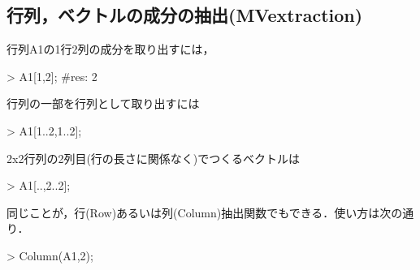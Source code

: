 \subsection{行列，ベクトルの成分の抽出(MVextraction)}
行列A1の1行2列の成分を取り出すには，
\begin{MapleInput}
> A1[1,2]; #res: 2
\end{MapleInput}
行列の一部を行列として取り出すには
\begin{MapleInput}
> A1[1..2,1..2];
\end{MapleInput}
\begin{MapleOutput}
\displaystyle  \left[ \begin {array}{cc} 1&2\\ 3&4\end {array} \right]
\end{MapleOutput}
2x2行列の2列目(行の長さに関係なく)でつくるベクトルは
\begin{MapleInput}
> A1[..,2..2];
\end{MapleInput}
\begin{MapleOutput}
\displaystyle  \left[ \begin {array}{c} 2\\ 4\end {array} \right] 
\end{MapleOutput}
同じことが，行(Row)あるいは列(Column)抽出関数でもできる．使い方は次の通り．
\begin{MapleInput}
> Column(A1,2);
\end{MapleInput}
\begin{MapleOutput}
\displaystyle  \left[ \begin {array}{c} 2\\ 4\end {array} \right]
\end{MapleOutput}
